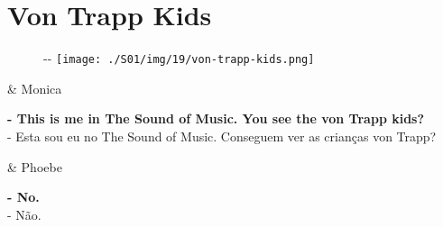 \hypertarget{von-trapp-kids}{%
\section{Von Trapp Kids}\label{von-trapp-kids}}

\begin{figure}[!ht]
  \begin{adjustwidth}{-\oddsidemargin-1in}{-\rightmargin}
    \centering
    \texttt{[image: ./S01/img/19/von-trapp-kids.png]}
  \end{adjustwidth}
\end{figure}

\begin{tcolorbox}[enhanced,center upper,
    drop fuzzy shadow southeast, boxrule=0.3pt,
    lower separated=false, breakable,
    colframe=black!30!dialogoBorder,colback=white]
\begin{minipage}[c]{0.16\linewidth}
   & \centering \scriptsize{Monica}
\end{minipage}
\hfill
\begin{minipage}[c]{0.8\linewidth}
  \textbf{- This is me in The Sound of Music. You see the von Trapp kids?}\\
  - Esta sou eu no The Sound of Music. Conseguem ver as crianças von Trapp?
\end{minipage}

\medskip
\begin{minipage}[c]{0.16\linewidth}
   & \centering \scriptsize{Phoebe}
\end{minipage}
\hfill
\begin{minipage}[c]{0.8\linewidth}
  \textbf{- No.}\\
  - Não.
\end{minipage}


\end{tcolorbox}
